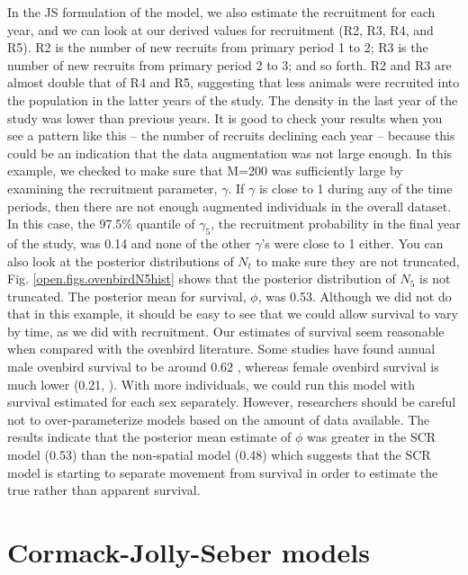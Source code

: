 In the JS formulation of the model, we also estimate the recruitment
for each year, and we can look at our derived values for recruitment
(R2, R3, R4, and R5).  R2 is the number of new recruits from primary
period 1 to 2; R3 is the number of new recruits from primary period 2
to 3; and so forth.  R2 and R3 are almost double that of R4 and R5,
suggesting that less animals were recruited into the population in the
latter years of the study.  The density in the last year of the study
was lower than previous years.  It is good to check your results when
you see a pattern like this -- the number of recruits declining each
year -- because this could be an indication that the data augmentation
was not large enough.  In this example, we checked to make sure that
M=200 was sufficiently large by examining the recruitment parameter,
$\gamma$.  If $\gamma$ is close to 1 during any of the time periods,
then there are not enough augmented individuals in the overall
dataset.  In this case, the 97.5\% quantile of $\gamma_5$, the
recruitment probability in the final year of the study, was 0.14 and
none of the other $\gamma$'s were close to 1 either.  You can also
look at the posterior distributions of $N_t$ to make sure they are not
truncated, Fig. \ref{open.figs.ovenbirdN5hist} shows that the
posterior distribution of $N_5$ is not truncated. The posterior mean
for survival, $\phi$, was 0.53.  Although we did not do that in this
example, it should be easy to see that we could allow survival to vary
by time, as we did with recruitment.  Our estimates of survival seem
reasonable when compared with the ovenbird literature.  Some studies
have found annual male ovenbird survival to be around 0.62
\citep{porneluzi_faaborg:1999, bayne_hobson:2002}, whereas female
ovenbird survival is much lower (0.21, \cite{bayne_hobson:2002}). With
more individuals, we could run this model with survival estimated for
each sex separately.  However, researchers should be careful not to
over-parameterize models based on the amount of data available.  The
results indicate that the posterior mean estimate of $\phi$ was
greater in the SCR model (0.53) than the non-spatial model (0.48)
which suggests that the SCR model is starting to separate movement
from survival in order to estimate the true rather than apparent
survival.



\section{Cormack-Jolly-Seber models}
\label{open.sec.cjs}

